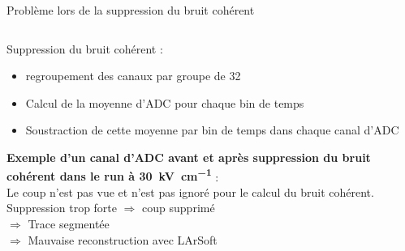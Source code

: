 \begin{frame}{Problème lors de la suppression du bruit cohérent}
\begin{scriptsize}
\begin{columns}
\begin{column}{0.55\textwidth}
                    Suppression du bruit cohérent :
                    \begin{itemize}
                        \item regroupement des canaux par groupe de 32
                        \item Calcul de la moyenne d'ADC pour chaque bin de temps
                        \item Soustraction de cette moyenne par bin de temps dans chaque canal d'ADC
                    \end{itemize} 
                    \vspace{0.3cm}
                    \textbf{ Exemple d'un canal d'ADC avant et après suppression du bruit cohérent dans le run à \SI{30}{\kilo\volt\per\centi\meter} }: \\Le coup n'est pas vue et n'est pas ignoré pour le calcul du bruit cohérent. \\
                     Suppression trop forte $\Rightarrow$ coup supprimé \\
                    $\Rightarrow$ Trace segmentée \\
                    $\Rightarrow$ Mauvaise reconstruction avec LArSoft \\
                \end{column}
            \end{columns}
        \end{scriptsize}
    \end{frame}

